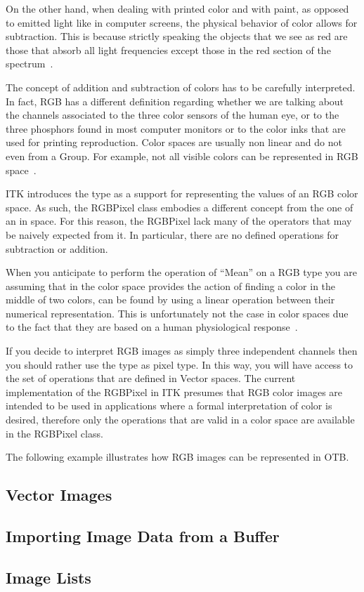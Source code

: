 On the other hand, when dealing with printed color and with paint, as opposed
to emitted light like in computer screens, the physical behavior of color
allows for subtraction. This is because strictly speaking the objects that we
see as red are those that absorb all light frequencies except those in the red
section of the spectrum~\cite{Wyszecki2000}.

The concept of addition and subtraction of colors has to be carefully
interpreted. In fact, RGB has a different definition regarding whether we are
talking about the channels associated to the three color sensors of the human
eye, or to the three phosphors found in most computer monitors or to the color
inks that are used for printing reproduction.  Color spaces are usually non
linear and do not even from a Group. For example, not all visible colors can be
represented in RGB space~\cite{Wyszecki2000}.

ITK introduces the  type as a support for representing the
values of an RGB color space. As such, the RGBPixel class embodies a different
concept from the one of an  in space. For this reason, the
RGBPixel lack many of the operators that may be naively expected from it. In
particular, there are no defined operations for subtraction or addition.

When you anticipate to perform the operation of ``Mean'' on a RGB type you are
assuming that in the color space provides the action of finding a color in the
middle of two colors, can be found by using a linear operation between their
numerical representation. This is unfortunately not the case in  color spaces
due to the fact that they are based on a human physiological
response~\cite{Malacara2002}.

If you decide to interpret RGB images as simply three independent channels then
you should rather use the  type as pixel type. In this way, you
will have access to the set of operations that are defined in Vector spaces.
The current implementation of the RGBPixel in ITK presumes that RGB color
images are intended to be used in applications where a formal interpretation of
color is desired, therefore only the operations that are valid in a color space
are available in the RGBPixel class.

The following example illustrates how RGB images can be represented in OTB.


\subsection{Vector Images}
\label{sec:DefiningVectorImages}




\subsection{Importing Image Data from a Buffer}
\label{sec:ImportingImageDataFromABuffer}


\subsection{Image Lists}
\label{sec:ImageLists}



